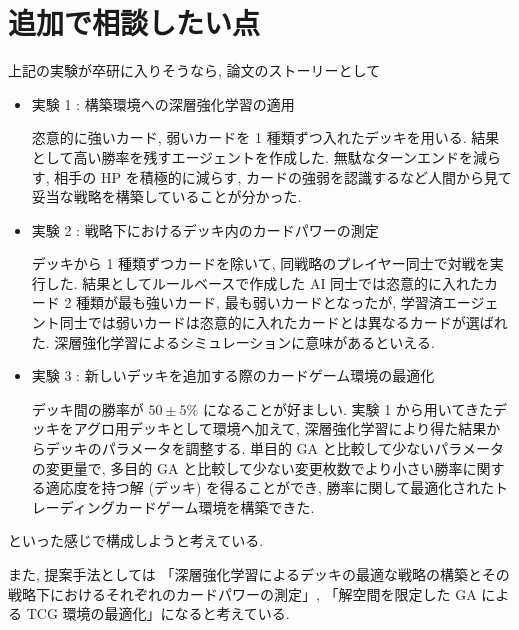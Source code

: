 \documentclass{jarticle}     %
\begin{document}
\section{追加で相談したい点}
上記の実験が卒研に入りそうなら, 論文のストーリーとして
\begin{itemize}
  \item 実験 1 : 構築環境への深層強化学習の適用
  \par
  恣意的に強いカード, 弱いカードを 1 種類ずつ入れたデッキを用いる. 
  結果として高い勝率を残すエージェントを作成した. 無駄なターンエンドを減らす, 相手の HP を積極的に減らす, カードの強弱を認識するなど人間から見て妥当な戦略を構築していることが分かった.
  \item 実験 2 : 戦略下におけるデッキ内のカードパワーの測定
  \par
  デッキから 1 種類ずつカードを除いて, 同戦略のプレイヤー同士で対戦を実行した. 結果としてルールベースで作成した AI 同士では恣意的に入れたカード 2 種類が最も強いカード, 最も弱いカードとなったが, 学習済エージェント同士では弱いカードは恣意的に入れたカードとは異なるカードが選ばれた. 
  深層強化学習によるシミュレーションに意味があるといえる.
  \item 実験 3 : 新しいデッキを追加する際のカードゲーム環境の最適化
  \par
  デッキ間の勝率が $50 \pm 5 \%$ になることが好ましい. 実験 1 から用いてきたデッキをアグロ用デッキとして環境へ加えて, 深層強化学習により得た結果からデッキのパラメータを調整する. 単目的 GA と比較して少ないパラメータの変更量で, 多目的 GA と比較して少ない変更枚数でより小さい勝率に関する適応度を持つ解 (デッキ) を得ることができ, 勝率に関して最適化されたトレーディングカードゲーム環境を構築できた. 
\end{itemize}
といった感じで構成しようと考えている. 

また, 提案手法としては 「深層強化学習によるデッキの最適な戦略の構築とその戦略下におけるそれぞれのカードパワーの測定」, 「解空間を限定した GA による TCG 環境の最適化」になると考えている. 



\end{document}

